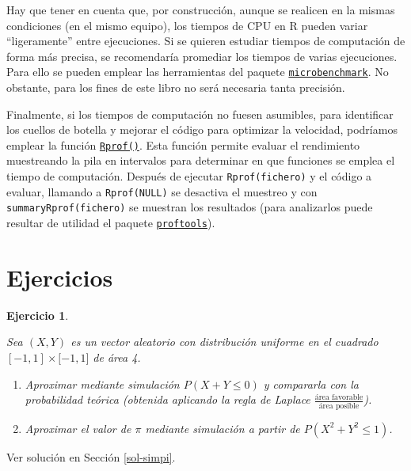 \documentclass[
  spanish,
  10pt,
]{book}
\theoremstyle{break}
\newtheorem{exercise}{Ejercicio}[chapter]
\theoremstyle{nonumberplain}
\begin{document}
Hay que tener en cuenta que, por construcción, aunque se realicen en la mismas condiciones (en el mismo equipo), los tiempos de CPU en R pueden variar ``ligeramente'' entre ejecuciones.
Si se quieren estudiar tiempos de computación de forma más precisa, se recomendaría promediar los tiempos de varias ejecuciones.
Para ello se pueden emplear las herramientas del paquete \href{https://github.com/joshuaulrich/microbenchmark/}{\texttt{microbenchmark}}.
No obstante, para los fines de este libro no será necesaria tanta precisión.

Finalmente, si los tiempos de computación no fuesen asumibles, para identificar los cuellos de botella y mejorar el código para optimizar la velocidad, podríamos emplear la función \href{https://rdrr.io/r/utils/Rprof.html}{\texttt{Rprof()}}.
Esta función permite evaluar el rendimiento muestreando la pila en intervalos para determinar en que funciones se emplea el tiempo de computación.
Después de ejecutar \texttt{Rprof(fichero)} y el código a evaluar, llamando a \texttt{Rprof(NULL)} se desactiva el muestreo y con \texttt{summaryRprof(fichero)} se muestran los resultados (para analizarlos puede resultar de utilidad el paquete \href{https://CRAN.R-project.org/package=proftools}{\texttt{proftools}}).

\section{Ejercicios}\label{ejercicios}

\begin{exercise}
\protect\hypertarget{exr:simpi}{}\label{exr:simpi}

Sea \((X,Y)\) es un vector aleatorio con distribución uniforme en el
cuadrado \([-1,1]\times\lbrack-1,1]\) de área 4.

\begin{enumerate}
\def\labelenumi{\alph{enumi})}
\item
  Aproximar mediante simulación \(P\left(X + Y \leq 0 \right)\) y
  compararla con la probabilidad teórica (obtenida aplicando la
  regla de Laplace \(\frac{\text{área favorable}}{\text{área posible}}\)).
\item
  Aproximar el valor de \(\pi\) mediante simulación a partir de
  \(P\left( X^2 +Y^2 \leq 1 \right)\).
\end{enumerate}

\end{exercise}

Ver solución en Sección \ref{sol-simpi}.
\end{document}

